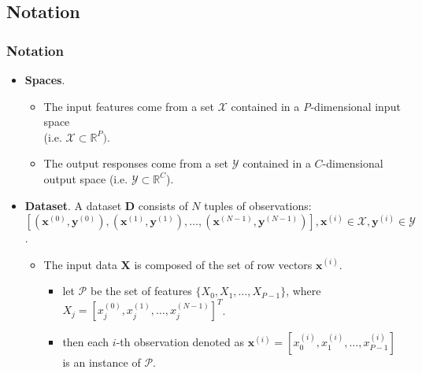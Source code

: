 \documentclass[11pt,
               aspectratio=169
               ]{beamer}
\begin{document}
	\subsection{Notation}
	
		\begin{frame}
		
			\frametitle{Notation}
			
				\begin{itemize}
					\item \textbf{Spaces}.  
					\begin{itemize}
						\item The input features come from a set  $\mathcal{X}$ contained in a \textit{P}-dimensional input space\\ (i.e. $\mathcal{X} \subset \mathbb{R}^P)$.  
						\item The output responses come from a set $\mathcal{Y}$ contained in a $C$-dimensional output space (i.e. $\mathcal{Y} \subset \mathbb{R}^C$).
					\end{itemize}	
					\bigskip	
					\item \textbf{Dataset}. A dataset $\mathbf{D}$ consists of $N$ tuples of observations:\\ $[(\mathbf{x}^{(0)},\mathbf{y}^{(0)}), (\mathbf{x}^{(1)},\mathbf{y}^{(1)}), \dots, (\mathbf{x}^{(N-1)},\mathbf{y}^{(N-1)})], \mathbf{x}^{(i)} \in \mathcal{X}, \mathbf{y}^{(i)} \in \mathcal{Y}$.\\
					\begin{itemize}
						\item The input data $\mathbf{X}$ is composed of the set of row vectors $\mathbf{x}^{(i)}$. 
						\begin{itemize}
							\item let $\mathcal{P}$ be the set of features  $\{X_0, X_1, \dots, X_{P-1}\}$, where $X_j = \left[x_{j}^{(0)}, x_{j}^{(1)}, \dots, x_{j}^{(N-1)} \right]^T$.
							\item then each $i$-th observation denoted as $\mathbf{x}^{(i)} = \left[x_0^{(i)}, x_1^{(i)}, \dots, x_{P-1}^{(i)} \right]$ is an instance of $\mathcal{P}$.
						\end{itemize}
				\end{itemize}
			\end{itemize}
		
		\end{frame}

\end{document}
